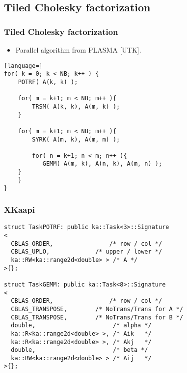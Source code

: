 \subsection{Tiled Cholesky factorization}
\begin{frame}
  \frametitle{Tiled Cholesky factorization}
  \begin{itemize}
  \item Parallel algorithm from PLASMA [UTK].
  \end{itemize}
\begin{block}{}
\begin{lstlisting}[language=]
for( k = 0; k < NB; k++ ) {
    POTRF( A(k, k) );
    
    for( m = k+1; m < NB; m++ ){
        TRSM( A(k, k), A(m, k) );
    }

    for( m = k+1; m < NB; m++ ){
        SYRK( A(m, k), A(m, m) );

        for( n = k+1; n < m; n++ ){
           GEMM( A(m, k), A(n, k), A(m, n) );
	}
    }
}
\end{lstlisting}
\end{block}
\end{frame}
\begin{frame}
  \frametitle{XKaapi}
  \vspace{-4mm}
  \begin{block}{}
\begin{lstlisting}[basicstyle=\scriptsize\ttfamily]
struct TaskPOTRF: public ka::Task<3>::Signature
<
  CBLAS_ORDER,			      /* row / col */
  CBLAS_UPLO,             /* upper / lower */
  ka::RW<ka::range2d<double> > /* A */
>{};

struct TaskGEMM: public ka::Task<8>::Signature
<
  CBLAS_ORDER,			      /* row / col */
  CBLAS_TRANSPOSE,        /* NoTrans/Trans for A */
  CBLAS_TRANSPOSE,        /* NoTrans/Trans for B */
  double,                      /* alpha */
  ka::R<ka::range2d<double> >, /* Aik   */
  ka::R<ka::range2d<double> >, /* Akj   */
  double,                      /* beta */
  ka::RW<ka::range2d<double> > /* Aij   */
>{};
\end{lstlisting}
  \end{block}
\end{frame}
